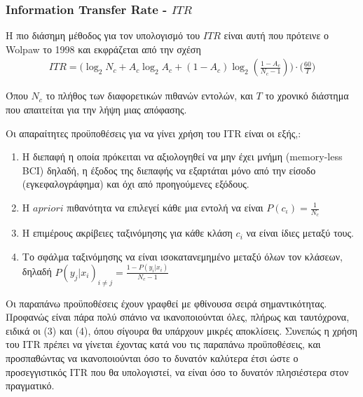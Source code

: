 \documentclass[11pt,a4paper,english,greek,twoside]{../Thesis}
\begin{document}
  \subsubsection{Information Transfer Rate - $ITR$}
  \par Η πιο διάσημη μέθοδος για τον υπολογισμό του $ITR$ είναι αυτή που πρότεινε ο Wolpaw το 1998 \cite{Wolpaw1998-yo} και εκφράζεται από την σχέση 
  \begin{align}
      ITR = \Big(\log_2N_c+A_c\log_2A_c+(1-A_c)\log_2(\frac{1-A_c}{N_c-1})\Big)\cdot\Big(\frac{60}{T}\Big)
  \end{align}
  \par Όπου $N_c$ το πλήθος των διαφορετικών πιθανών εντολών, και $T$ το χρονικό διάστημα που απαιτείται για την λήψη μιας απόφασης.
  \par Οι απαραίτητες προϋποθέσεις για να γίνει χρήση του ITR είναι οι εξής\cite{Wolpaw1998-yo},\cite{wolpaw2002brain}:
  \begin{enumerate}
      \item Η διεπαφή η οποία πρόκειται να αξιολογηθεί να μην έχει μνήμη (memory-less BCI) δηλαδή, η έξοδος της διεπαφής να εξαρτάται μόνο από την είσοδο (εγκεφαλογράφημα) και όχι από προηγούμενες εξόδους.
      \item Η $a priori$ πιθανότητα να επιλεγεί κάθε μια εντολή να είναι $P(c_ι) = \frac{1}{N_c}$
      \item Η επιμέρους ακρίβειες ταξινόμησης για κάθε κλάση $c_i$ να είναι ίδιες μεταξύ τους.
      \item Το σφάλμα ταξινόμησης να είναι ισοκατανεμημένο μεταξύ όλων τον κλάσεων, δηλαδή $P(y_j|x_i)_{i\neq j} = \frac{1-P(y_i|x_i)}{N_c-1}$
  \end{enumerate}
  \par Οι παραπάνω προϋποθέσεις έχουν γραφθεί με φθίνουσα σειρά σημαντικότητας. Προφανώς είναι πάρα πολύ σπάνιο να ικανοποιούνται όλες, πλήρως και ταυτόχρονα, ειδικά οι (3) και (4), όπου σίγουρα θα υπάρχουν μικρές αποκλίσεις. Συνεπώς η χρήση του ITR πρέπει να γίνεται έχοντας κατά νου τις παραπάνω προϋποθέσεις, και προσπαθώντας να ικανοποιούνται όσο το δυνατόν καλύτερα έτσι ώστε ο προσεγγιστικός ITR που θα υπολογιστεί, να είναι όσο το δυνατόν πλησιέστερα στον πραγματικό.
  
\end{document}
